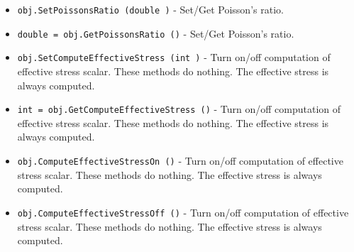 \begin{itemize}
\item  \verb|obj.SetPoissonsRatio (double )| -  Set/Get Poisson's ratio.

\item  \verb|double = obj.GetPoissonsRatio ()| -  Set/Get Poisson's ratio.

\item  \verb|obj.SetComputeEffectiveStress (int )| -  Turn on/off computation of effective stress scalar. These methods do 
 nothing. The effective stress is always computed.

\item  \verb|int = obj.GetComputeEffectiveStress ()| -  Turn on/off computation of effective stress scalar. These methods do 
 nothing. The effective stress is always computed.

\item  \verb|obj.ComputeEffectiveStressOn ()| -  Turn on/off computation of effective stress scalar. These methods do 
 nothing. The effective stress is always computed.

\item  \verb|obj.ComputeEffectiveStressOff ()| -  Turn on/off computation of effective stress scalar. These methods do 
 nothing. The effective stress is always computed.

\end{itemize}
